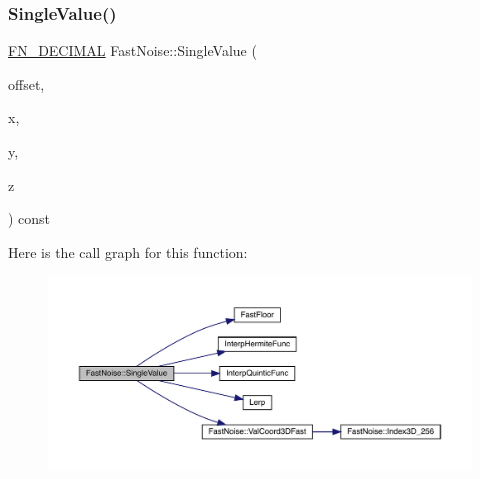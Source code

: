 \subsubsection{\texorpdfstring{Single\+Value()}{SingleValue()}\hspace{0.1cm}{\footnotesize\ttfamily [2/2]}}
{\footnotesize\ttfamily \mbox{\hyperlink{_fast_noise_8h_a75a9ef6d2541c4921815b885bfd449c3}{F\+N\+\_\+\+D\+E\+C\+I\+M\+AL}} Fast\+Noise\+::\+Single\+Value (\begin{DoxyParamCaption}\item[{unsigned char}]{offset,  }\item[{\mbox{\hyperlink{_fast_noise_8h_a75a9ef6d2541c4921815b885bfd449c3}{F\+N\+\_\+\+D\+E\+C\+I\+M\+AL}}}]{x,  }\item[{\mbox{\hyperlink{_fast_noise_8h_a75a9ef6d2541c4921815b885bfd449c3}{F\+N\+\_\+\+D\+E\+C\+I\+M\+AL}}}]{y,  }\item[{\mbox{\hyperlink{_fast_noise_8h_a75a9ef6d2541c4921815b885bfd449c3}{F\+N\+\_\+\+D\+E\+C\+I\+M\+AL}}}]{z }\end{DoxyParamCaption}) const\hspace{0.3cm}{\ttfamily [private]}}

Here is the call graph for this function\+:
\nopagebreak
\begin{figure}[H]
\begin{center}
\leavevmode
\includegraphics[width=350pt]{class_fast_noise_a982fae6250ecadc33331384167fcbc2d_cgraph}
\end{center}
\end{figure}
\mbox{\label{class_fast_noise_a9ce9cdb72f3c9acaf76511d723e8e1ae}} 
